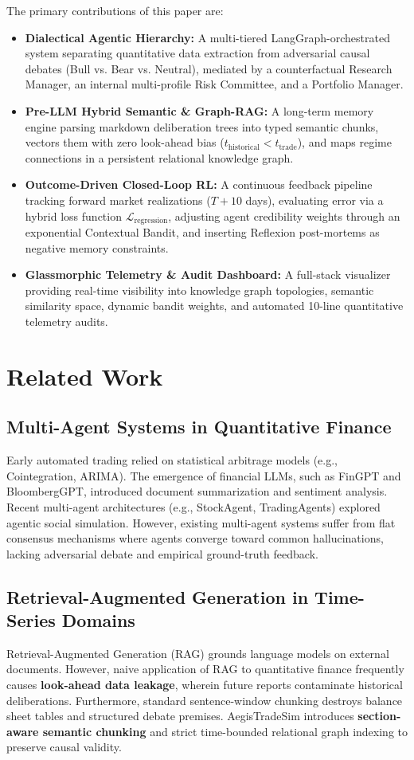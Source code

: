 \documentclass[conference]{IEEEtran}
\begin{document}
The primary contributions of this paper are:
\begin{itemize}
    \item \textbf{Dialectical Agentic Hierarchy:} A multi-tiered LangGraph-orchestrated system separating quantitative data extraction from adversarial causal debates (Bull vs. Bear vs. Neutral), mediated by a counterfactual Research Manager, an internal multi-profile Risk Committee, and a Portfolio Manager.
    \item \textbf{Pre-LLM Hybrid Semantic \& Graph-RAG:} A long-term memory engine parsing markdown deliberation trees into typed semantic chunks, vectors them with zero look-ahead bias ($t_{\text{historical}} < t_{\text{trade}}$), and maps regime connections in a persistent relational knowledge graph.
    \item \textbf{Outcome-Driven Closed-Loop RL:} A continuous feedback pipeline tracking forward market realizations ($T+10$ days), evaluating error via a hybrid loss function $\mathcal{L}_{\text{regression}}$, adjusting agent credibility weights through an exponential Contextual Bandit, and inserting Reflexion post-mortems as negative memory constraints.
    \item \textbf{Glassmorphic Telemetry \& Audit Dashboard:} A full-stack visualizer providing real-time visibility into knowledge graph topologies, semantic similarity space, dynamic bandit weights, and automated 10-line quantitative telemetry audits.
\end{itemize}

\section{Related Work}
\subsection{Multi-Agent Systems in Quantitative Finance}
Early automated trading relied on statistical arbitrage models (e.g., Cointegration, ARIMA). The emergence of financial LLMs, such as FinGPT and BloombergGPT, introduced document summarization and sentiment analysis. Recent multi-agent architectures (e.g., StockAgent, TradingAgents) explored agentic social simulation. However, existing multi-agent systems suffer from flat consensus mechanisms where agents converge toward common hallucinations, lacking adversarial debate and empirical ground-truth feedback.

\subsection{Retrieval-Augmented Generation in Time-Series Domains}
Retrieval-Augmented Generation (RAG) grounds language models on external documents. However, naive application of RAG to quantitative finance frequently causes \textbf{look-ahead data leakage}, wherein future reports contaminate historical deliberations. Furthermore, standard sentence-window chunking destroys balance sheet tables and structured debate premises. AegisTradeSim introduces \textbf{section-aware semantic chunking} and strict time-bounded relational graph indexing to preserve causal validity.
\end{document}
